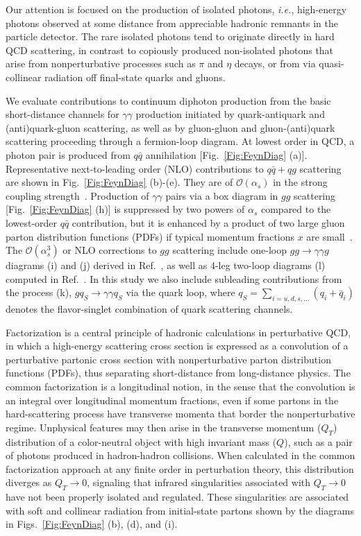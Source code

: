 \documentclass[12pt,english,aps,preprint,prd,letterpaper,fleqn,nofootinbib,showpacs,showkeys,tightenlines,floatfix]{revtex4}
\begin{document}
Our attention is focused on the production of isolated photons, \emph{i.e.},
high-energy photons observed at some distance from appreciable hadronic
remnants in the particle detector. The rare isolated photons tend
to originate directly in hard QCD scattering, in contrast to copiously
produced non-isolated photons that arise from nonperturbative processes
such as $\pi$ and $\eta$ decays, or from via quasi-collinear radiation
off final-state quarks and gluons.

We evaluate contributions to continuum diphoton production from the
basic short-distance channels for $\gamma\gamma$ production initiated
by quark-antiquark and (anti)quark-gluon scattering, as well as by
gluon-gluon and gluon-(anti)quark scattering proceeding through a
fermion-loop diagram. At lowest order in QCD, a photon pair is produced
from $q\bar{q}$ annihilation {[}Fig.~\ref{Fig:FeynDiag} (a)]. Representative
next-to-leading order (NLO) contributions to $q\bar{q}+qg$ scattering
are shown in Fig.~\ref{Fig:FeynDiag} (b)-(e). They are of ${\mathcal{O}}(\alpha_{s})$
in the strong coupling strength~\cite{Aurenche:1985yk,Bailey:1992br}.
Production of $\gamma\gamma$ pairs via a box diagram in $gg$ scattering
{[}Fig.~\ref{Fig:FeynDiag} (h)] is suppressed by two powers of $\alpha_{s}$
compared to the lowest-order $q\bar{q}$ contribution, but it is enhanced
by a product of two large gluon parton distribution functions (PDFs)
if typical momentum fractions $x$ are small~\cite{Berger:1983yi}.
The ${\mathcal{O}}(\alpha_{s}^{3})$ or NLO corrections to $gg$ scattering
include one-loop $gg\rightarrow\gamma\gamma g$ diagrams (i) and (j)
derived in Ref.~\cite{Balazs:1999yf,deFlorian:1999tp}, as well as
4-leg two-loop diagrams (l) computed in Ref.~\cite{Bern:2001df,Bern:2002jx}.
In this study we also include subleading contributions from the process
(k), $gq_{S}\rightarrow\gamma\gamma q_{S}$ via the quark loop, where
$q_{S}=\sum_{i=u,d,s,...}(q_{i}+\bar{q}_{i})$ denotes the flavor-singlet
combination of quark scattering channels.

Factorization is a central principle of hadronic calculations in perturbative
QCD, in which a high-energy scattering cross section is expressed as
a convolution of a perturbative partonic cross section with nonperturbative
parton distribution functions (PDFs), thus separating short-distance
from long-distance physics. The common factorization is a longitudinal
notion, in the sense that the convolution is an integral over longitudinal
momentum fractions, even if some partons in the hard-scattering process 
have transverse momenta that border the nonperturbative regime.
Unphysical features may then arise in the transverse momentum
($Q_{T}$) distribution of a color-neutral object with high invariant
mass ($Q$), such as a pair of photons produced in hadron-hadron collisions.
When calculated in the common factorization approach at any finite
order in perturbation theory, this distribution diverges as $Q_{T}\rightarrow0$,
signaling that infrared singularities associated with $Q_{T}\rightarrow0$
have not been properly isolated and regulated. These singularities
are associated with soft and collinear radiation from initial-state
partons shown by the diagrams in Figs.~\ref{Fig:FeynDiag} (b), (d),
and (i).
\end{document}

